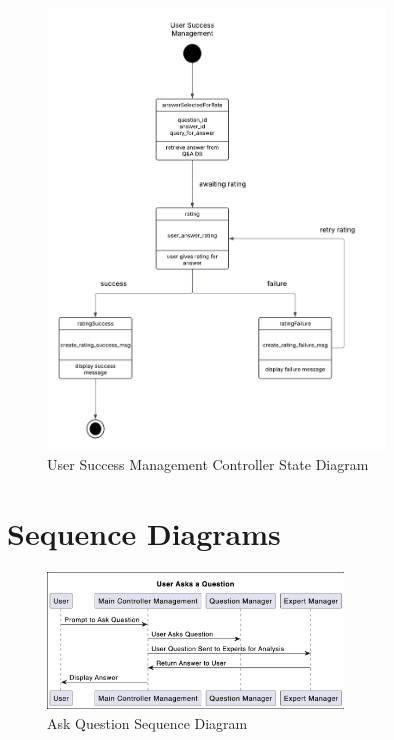 \documentclass[]{article}
\numberwithin{figure}{section}
\begin{document}
\begin{figure}[h]
    \centering
    \includegraphics[width=0.8\textwidth]{diagrams/state/UserSuccessState.png} %
    \caption{User Success Management Controller State Diagram}
\end{figure}

\clearpage
\section{Sequence Diagrams}
\label{sec:sequence_diagrams}
\begin{figure}[ht]
    \centering
    \includegraphics[width=0.7\textwidth]{diagrams/sequence/AskQuestionSequence.png} %
    \caption{Ask Question Sequence Diagram}
\end{figure}
\end{document}
